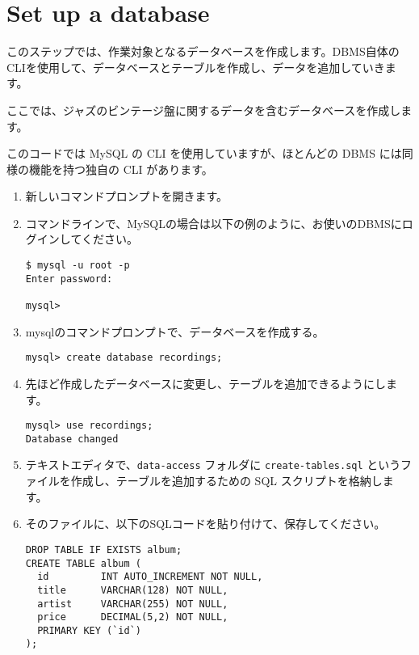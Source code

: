 \section{Set up a database}

このステップでは、作業対象となるデータベースを作成します。DBMS自体のCLIを使用して、データベースとテーブルを作成し、データを追加していきます。

ここでは、ジャズのビンテージ盤に関するデータを含むデータベースを作成します。

このコードでは MySQL の CLI を使用していますが、ほとんどの DBMS には同様の機能を持つ独自の CLI があります。

\begin{enumerate}

\item 新しいコマンドプロンプトを開きます。

\item コマンドラインで、MySQLの場合は以下の例のように、お使いのDBMSにログインしてください。

\begin{lstlisting}[numbers=none]
$ mysql -u root -p
Enter password:

mysql>
\end{lstlisting}

\item mysqlのコマンドプロンプトで、データベースを作成する。

\begin{lstlisting}[numbers=none]
mysql> create database recordings;
\end{lstlisting}

\item 先ほど作成したデータベースに変更し、テーブルを追加できるようにします。

\begin{lstlisting}[numbers=none]
mysql> use recordings;
Database changed
\end{lstlisting}

\item テキストエディタで、\texttt{data-access} フォルダに \texttt{create-tables.sql} というファイルを作成し、テーブルを追加するための SQL スクリプトを格納します。

\item そのファイルに、以下のSQLコードを貼り付けて、保存してください。

\begin{lstlisting}[numbers=none]
DROP TABLE IF EXISTS album;
CREATE TABLE album (
  id         INT AUTO_INCREMENT NOT NULL,
  title      VARCHAR(128) NOT NULL,
  artist     VARCHAR(255) NOT NULL,
  price      DECIMAL(5,2) NOT NULL,
  PRIMARY KEY (`id`)
);


\end{lstlisting}
\end{enumerate}

